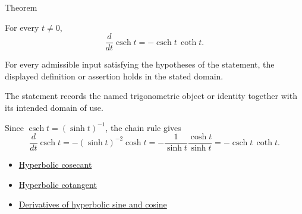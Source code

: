 \begin{theorembox}{Theorem}
\begin{theorem}
\label{thm:hyperbolic-cosecant-derivative}
For every $t\neq 0$,
\[
  \frac{d}{dt}\operatorname{csch}t
  =
  -\operatorname{csch}t\,\operatorname{coth}t.
\]
\end{theorem}
\end{theorembox}
\begin{remark*}
For every admissible input satisfying the hypotheses of the statement, the
displayed definition or assertion holds in the stated domain.
\end{remark*}

\begin{remark*}[Interpretation]
The statement records the named trigonometric object or identity together with
its intended domain of use.
\end{remark*}

\begin{remark*}[Proof]
Since $\operatorname{csch}t=(\sinh t)^{-1}$, the chain rule gives
\[
  \frac{d}{dt}\operatorname{csch}t
  =
  -(\sinh t)^{-2}\cosh t
  =
  -\frac{1}{\sinh t}\frac{\cosh t}{\sinh t}
  =
  -\operatorname{csch}t\,\operatorname{coth}t.
\]
\end{remark*}
\begin{dependencies}
\begin{itemize}
  \item \hyperref[def:hyperbolic-cosecant]{Hyperbolic cosecant}
  \item \hyperref[def:hyperbolic-cotangent]{Hyperbolic cotangent}
  \item \hyperref[thm:hyperbolic-sinh-cosh-derivatives]{Derivatives of hyperbolic sine and cosine}
\end{itemize}
\end{dependencies}
